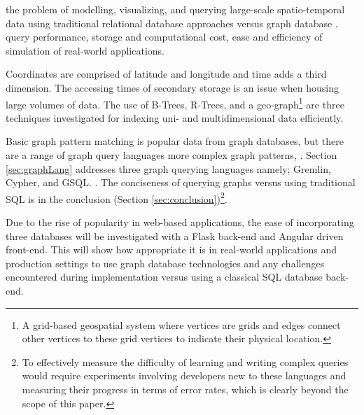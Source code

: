  the problem of modelling, visualizing, and querying large-scale spatio-temporal data using traditional relational database approaches versus graph database . 
 query performance, storage and computational cost,  ease and efficiency of simulation of real-world applications. 

 Coordinates are comprised of latitude and longitude and time adds a third dimension. The accessing times of secondary storage is an issue when housing large volumes of data. The use of B-Trees, R-Trees, and a geo-graph\footnote{A grid-based geospatial system where vertices are grids and edges connect other vertices to these grid vertices to indicate their physical location.} are three techniques investigated for indexing  uni- and multidimensional data efficiently.

 Basic graph pattern matching is popular  data from graph databases, but there are a range of graph query languages  more complex graph patterns, . Section \ref{sec:graphLang} addresses three graph querying languages namely; Gremlin, Cypher, and GSQL. . The conciseness of querying graphs versus using traditional SQL is  in the conclusion (Section \ref{sec:conclusion})\footnote{To effectively measure the difficulty of learning and writing complex queries would require experiments involving developers new to these languages and measuring their progress in terms of error rates, which is clearly beyond the scope of this paper.}.

 Due to the rise of popularity in web-based applications, the ease of incorporating three  databases  will be investigated with a Flask \cite{flask} back-end and Angular \cite{angular} driven front-end. This will show how appropriate it is in real-world applications and production settings to use graph database technologies and any challenges encountered during implementation versus using a classical SQL database back-end.
